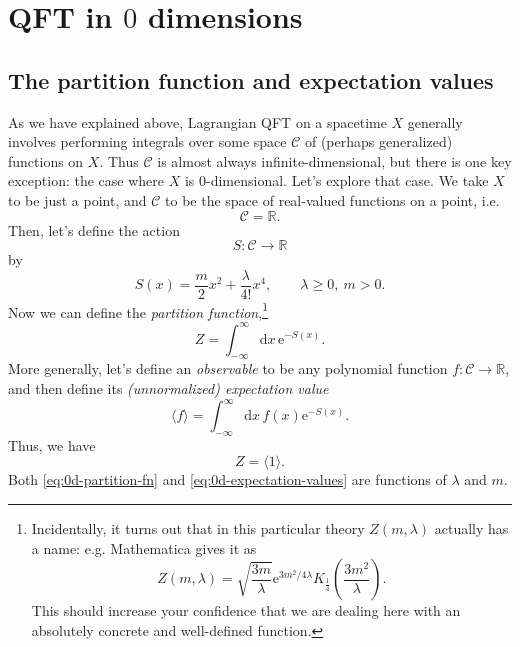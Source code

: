 \documentclass[12pt,letterpaper,reqno]{article}
\numberwithin{equation}{section}
\newcommand{\cC}{\ensuremath{\mathcal C}}
\newcommand{\R}{\ensuremath{\mathbb R}}
\newcommand{\e}{{\mathrm e}}
\newcommand{\de}{\mathrm{d}}
\newcommand{\IP}[1]{\langle#1\rangle}
\newcommand{\ti}[1]{\textit{#1}}
\begin{document}


\section{QFT in \texorpdfstring{$0$}{0} dimensions}

\subsection{The partition function and expectation values}

As we have explained above, Lagrangian QFT on a spacetime $X$ generally involves performing integrals
over some space $\cC$ of (perhaps generalized) functions on $X$. Thus $\cC$ is almost 
always infinite-dimensional,
but there is one key exception: the case where $X$ is $0$-dimensional. Let's explore that case.
We take $X$ to be just a point,
and $\cC$ to be the space of real-valued functions on a point, i.e.
\begin{equation}
  \cC = \R.
\end{equation}
Then, let's define the action
\begin{equation}
  S: \cC \to \R
\end{equation}
by
\begin{equation} \label{eq:0d-action-quartic}
  S(x) = \frac{m}{2} x^2 + \frac{\lambda}{4!} x^4, \qquad \lambda \ge 0, \ m > 0.
\end{equation}
Now we can define the \ti{partition function},\footnote{Incidentally, it turns out that in this particular theory $Z(m,\lambda)$ 
actually has a name: e.g. Mathematica gives it as
\begin{equation}
  Z(m,\lambda) = \sqrt{\frac{3m}{\lambda}} \e^{3 m^2 / 4 \lambda} K_{\frac14} \left(\frac{3m^2}{\lambda}\right).
\end{equation}
This should increase your confidence that we are dealing here with
an absolutely concrete and well-defined function.}
\begin{equation} \label{eq:0d-partition-fn}
  Z = \int_{-\infty}^\infty \de x \, \e^{-S(x)}.
\end{equation}
More generally, let's define an \ti{observable} to be any polynomial function $f: \cC \to \R$, and
then define its \ti{(unnormalized) expectation value}
\begin{equation} \label{eq:0d-expectation-values}
  \IP{f} = \int_{-\infty}^\infty \de x \, f(x) \e^{-S(x)}.
\end{equation}
Thus, we have
\begin{equation}
  Z = \IP{1}.
\end{equation}
Both \eqref{eq:0d-partition-fn} and \eqref{eq:0d-expectation-values} are functions of
$\lambda$ and $m$.
\end{document}
